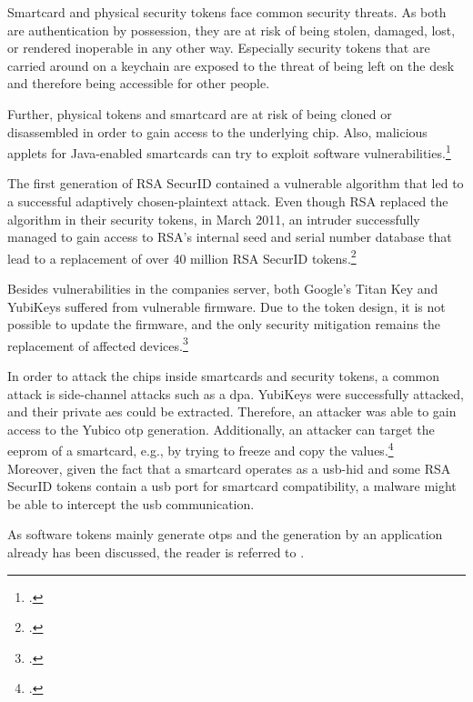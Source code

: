 Smartcard and physical security tokens face common security threats. As both are authentication by possession, they are at risk of being stolen, damaged, lost, or rendered inoperable in any other way. Especially security tokens that are carried around on a keychain are exposed to the threat of being left on the desk and therefore being accessible for other people.

Further, physical tokens and smartcard are at risk of being cloned or disassembled in order to gain access to the underlying chip. Also, malicious applets for Java-enabled smartcards can try to exploit software vulnerabilities.\footcites[See][14--16]{witteman2002advances}

The first generation of RSA SecurID contained a vulnerable algorithm that led to a successful adaptively chosen-plaintext attack. Even though RSA replaced the algorithm in their security tokens, in March 2011, an intruder successfully managed to gain access to RSA's internal seed and serial number database that lead to a replacement of over 40 million RSA SecurID tokens.\footcites[See][480]{eckert-it-sec-9}[See][369]{BIRYUKOV2005364}[See][8]{1324198}

Besides vulnerabilities in the companies server, both Google's Titan Key and YubiKeys suffered from vulnerable firmware. Due to the token design, it is not possible to update the firmware, and the only security mitigation remains the replacement of affected devices.\footcites[See][]{yubikey-heise}[See][]{titan-key}

In order to attack the chips inside smartcards and security tokens, a common attack is side-channel attacks such as a \gls{dpa}. YubiKeys were successfully attacked, and their private \gls{aes} could be extracted. Therefore, an attacker was able to gain access to the Yubico \gls{otp} generation. Additionally, an attacker can target the \gls{eeprom} of a smartcard, e.g., by trying to freeze and copy the values.\footcites[See][210, 212, 219]{10.1007/978-3-642-41284-4_11}[See][502--503, 509]{anderson2008security}\\
Moreover, given the fact that a smartcard operates as a \gls{usb}-\gls{hid} and some RSA SecurID tokens contain a \gls{usb} port for smartcard compatibility, a malware might be able to intercept the \gls{usb} communication.

As software tokens mainly generate \glspl{otp} and the generation by an application already has been discussed, the reader is referred to .
 